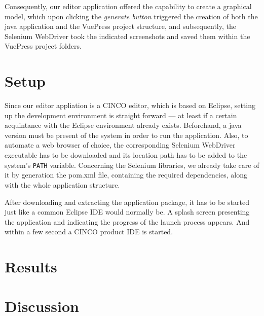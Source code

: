 Consequently, our editor application offered the capability to create a graphical model, which upon clicking the \textit{generate button} triggered the creation of both the java application and the VuePress project structure, and subsequently, the Selenium WebDriver took the indicated screenshots and saved them within the VuePress project folders.

\section{Setup}\label{sec:setup}

Since our editor appliation is a CINCO editor, which is based on Eclipse, setting up the development environment is straight forward --- at least if a certain acquintance with the Eclipse environment already exists. Beforehand, a java version must be present of the system in order to run the application. Also, to automate a web browser of choice, the corresponding Selenium WebDriver executable has to be downloaded and its location path has to be added to the system's \lstinline{PATH} variable. Concerning the Selenium libraries, we already take care of it by generation the pom.xml file, containing the required dependencies, along with the whole application structure.

After downloading and extracting the application package, it has to be started just like a common Eclipse IDE would normally be. A splash screen presenting the application and indicating the progress of the launch process appears. And within a few second a CINCO product IDE is started. 

\section{Results}\label{sec:res}

\section{Discussion}\label{sec:disc}
